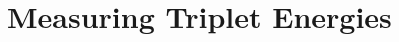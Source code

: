 \documentclass[../thesis.tex]{subfiles}
\begin{document}
\chapter{Measuring Triplet Energies}




\end{document}
